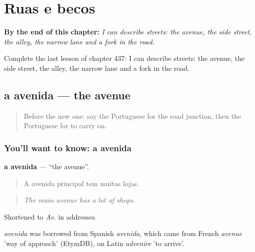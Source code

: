 
\chapter{Ruas e becos}
\label{ch:pt-ruas-e-becos}

\begin{chapteropening}
\textbf{By the end of this chapter:} \emph{I can describe streets: the avenue, the side street, the alley, the narrow lane and a fork in the road.}

Complete the last lesson of chapter 437: I can describe streets: the avenue, the side street, the alley, the narrow lane and a fork in the road.
\end{chapteropening}

\section[a avenida]{a avenida — the avenue}

\label{lesson:PT-C437-avenida}



\begin{quote}
Before the new one: say the Portuguese for the road junction, then the Portuguese for to carry on.
\end{quote}

\subsection*{You'll want to know: a avenida}
\textbf{a avenida} — \textquotedblleft{}the avenue\textquotedblright{}.

\begin{quote}
A avenida principal tem muitas lojas.
\end{quote}

\begin{quote}
\emph{The main avenue has a lot of shops.}
\end{quote}

Shortened to \emph{Av.} in addresses.

\begin{cousinweb}
\emph{avenida} was borrowed from Spanish \emph{avenida}, which came from French \emph{avenue} 'way of approach' (EtymDB), on Latin \emph{advenīre} 'to arrive'.
\end{cousinweb}

